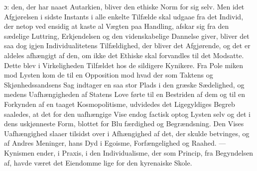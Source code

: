 \documentclass[12pt,a4paper]{book}
\newcommand{\gk}[1]{\textit{#1}}
\begin{document}
ɔ: den, der har naaet Autarkien, bliver den ethiske Norm for
sig selv. Men idet Afgjørelsen i sidste Instants i alle enkelte
Tilfælde skal udgaae fra det Individ, der netop ved ensidig at
kaste al Vægten paa Handling, afskar sig fra den sædelige
Luttring, Erkjendelsen og den videnskabelige Dannelse giver,
bliver det saa dog igjen Individualitetens Tilfældighed, der
bliver det Afgjørende, og det er aldeles afhængigt af den, om
ikke det Ethiske skal forvandles til det Modsatte. Dette blev
i Virkeligheden Tilfældet hos de sildigere Kynikere. Fra Pole\-%
miken mod Lysten kom de til en Opposition mod hvad der
som Taktens og Skjønhedssandsens Sag indtager en saa stor
Plads i den græske Sædelighed, og medens Uafhængigheden af
Statens Love førte til en Bestriden af dem og til en Forkynden
af en taaget Kosmopolitisme, udvidedes det Ligegyldiges Begreb
saaledes, at det for den uafhængige Vise endog factisk optog
Lysten selv og det i dens uskjønneste Form, blottet for Blu\-%
færdighed og Begrændsning. Den Vises Uafhængighed slaaer
tilsidst over i Afhængighed af det, der skulde betvinges, og
af Andres Meninger, hans Dyd i Egoisme, Forfængelighed og
Raahed. --- Kynismen ender, i Praxis, i den Individualisme, der
som Princip, fra Begyndelsen af, havde været det Eiendomme\-%
lige for den kyrenaiske Skole.
\end{document}
